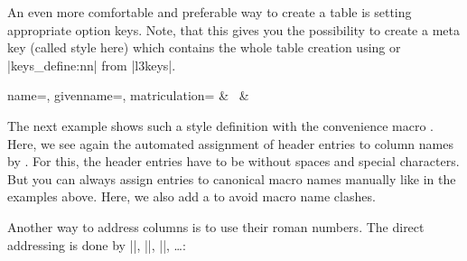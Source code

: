 \documentclass[a4paper,11pt]{ltxdoc}
\begin{document}
\smallskip
An even more comfortable and preferable way to create a table is setting
appropriate option keys. Note, that this gives you the possibility to create a
meta key (called style here) which contains the whole table creation
using  or |keys_define:nn| from |l3keys|.

\begin{dispExample}
  {name=\name, givenname=\firstname, matriculation=\matnumber}{%
    \thecsvrow & \firstname~\name & \matnumber
  }%
\end{dispExample}


\clearpage
The next example shows such a style definition with the convenience macro
. Here, we see again the automated assignment of header
entries to column names by .
For this, the header entries have to be without spaces and special characters.
But you can always assign entries to canonical macro names manually like in the examples
above. Here, we also add a  to avoid
macro name clashes.

\begin{dispExample}

\end{dispExample}


\smallskip
Another way to address columns is to use their roman numbers.
The direct addressing is done by |\csvcoli|, |\csvcolii|, |\csvcoliii|, \ldots:

\begin{dispExample}
\end{dispExample}
\end{document}
